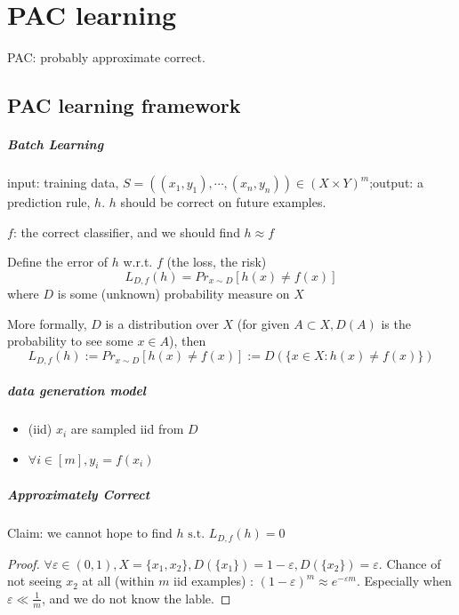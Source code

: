 \documentclass{book}
\newcommand{\st}{\text{ s.t. }}
\begin{document}


\chapter{PAC learning}
PAC: probably approximate correct.

\section{PAC learning framework}
\paragraph{Batch Learning }input: training data, $S=((x_{1},y_{1}),\cdots,(x_{n},y_{n}))\in (X\times Y)^{m}$;output: a prediction rule, $h$. $h$ should be correct on future examples.

$f$: the correct classifier, and we should find $h\approx f$

Define the error of $h$ w.r.t. $f$ (the loss, the risk)
\[L_{{D,f}}(h)=Pr_{x\sim D}[h(x)\neq f(x)]\]
where $D$ is some (unknown) probability measure on $X$

More formally, $D$ is a distribution over $X$ (for given $A\subset X, D(A)$ is the probability to see some $x\in A$), then
\[L_{D,f}(h):=Pr_{x\sim D}[h(x)\neq f(x)]:=D(\{x\in X:h(x)\neq f(x)\})\]

\paragraph{data generation model}
\begin{itemize}
\item (iid) $x_{i}$ are sampled iid from $D$
\item $\forall i\in[m],y_{i}=f(x_{i})$
\end{itemize}

\paragraph{Approximately Correct }
Claim: we cannot hope to find $h\st L_{D,f}(h)=0$
\begin{proof}
  $\forall\varepsilon\in (0,1),X=\{x_{1},x_{2}\}, D(\{x_{1}\})=1-\varepsilon, D(\{x_{2}\})=\varepsilon$. Chance of not seeing $x_{2}$ at all (within $m$ iid examples) : $(1-\varepsilon)^{m}\approx e^{-\varepsilon m}$. Especially when $\varepsilon\ll\frac{1}{m}$, and we do not know the lable.
\end{proof}
\end{document}
